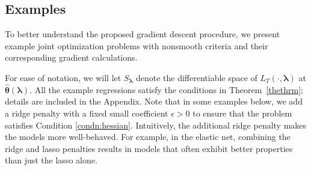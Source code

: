 \documentclass[12pt]{article}
\begin{document}
\begin{algorithm}
\begin{algorithmic}
	\ENDFOR
  \end{algorithmic}
\end{algorithm}

\subsection{Examples}\label{sec:examples}

To better understand the proposed gradient descent procedure, we present example joint optimization problems with nonsmooth criteria and their corresponding gradient calculations.

For ease of notation, we will let $S_{\boldsymbol{\lambda}}$ denote the differentiable space of $L_T(\cdot, \boldsymbol{\lambda})$ at $\hat{\boldsymbol{\theta}}(\boldsymbol{\lambda})$. All the example regressions satisfy the conditions in Theorem~\ref{thethrm}; details are included in the Appendix. Note that in some examples below, we add a ridge penalty with a fixed small coefficient $\epsilon > 0$ to ensure that the problem satisfies Condition \ref{condn:hessian}. Intuitively, the additional ridge penalty makes the models more well-behaved. For example, in the elastic net, combining the ridge and lasso penalties results in models that often exhibit better properties than just the lasso alone.
\end{document}
